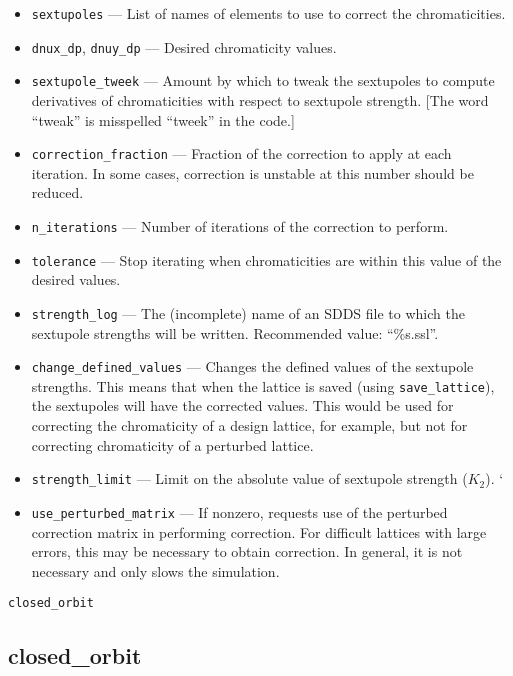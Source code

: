 \documentclass[11pt]{article}
\begin{document}
\begin{itemize}
\item \verb|sextupoles| --- List of names of elements to use to correct the chromaticities.
\item \verb|dnux_dp|, \verb|dnuy_dp| --- Desired chromaticity values.
\item \verb|sextupole_tweek| --- Amount by which to tweak the sextupoles to compute derivatives of
chromaticities with respect to sextupole strength.  [The word ``tweak'' is misspelled ``tweek'' in the code.]
\item \verb|correction_fraction| --- Fraction of the correction to apply at each iteration.  In some
cases, correction is unstable at this number should be reduced.
\item \verb|n_iterations| --- Number of iterations of the correction to perform.
\item \verb|tolerance| --- Stop iterating when chromaticities are within this value of the
desired values.
\item \verb|strength_log| --- The (incomplete) name of an SDDS file to which the sextupole strengths will
be written.  Recommended value: ``\%s.ssl''.
\item \verb|change_defined_values| --- Changes the defined values of the sextupole strengths.
This means that when the lattice is saved (using \verb|save_lattice|), the sextupoles will
have the corrected values.  This would be used for correcting the chromaticity of a design
lattice, for example, but not for correcting chromaticity of a perturbed lattice.
\item \verb|strength_limit| --- Limit on the absolute value of sextupole strength ($K_2$).
`\item \verb|use_perturbed_matrix| --- If nonzero, requests use of the perturbed correction matrix in
performing correction.  For difficult lattices with large errors, this may be necessary
to obtain correction.  In general, it is not necessary and only slows the simulation.
\end{itemize}

\begin{latexonly}
\newpage
\begin{center}{\Large\verb|closed_orbit|}\end{center}
\end{latexonly}
\subsection{closed\_orbit}
\end{document}
